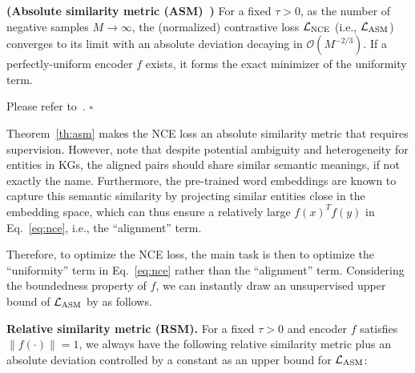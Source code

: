 \begin{theorem}{\bf (Absolute similarity metric (ASM)~\cite{wang2020understanding})} \label{th:asm}
For a fixed $\tau > 0$, as the number of negative samples $M \rightarrow \infty$, the (normalized) contrastive loss $\mathcal{L}_{\rm NCE}$ (i.e., $\mathcal{L}_{\rm ASM}$) converges to its limit with an absolute deviation decaying in $\mathcal{O}(M^{-2/3})$. If a perfectly-uniform encoder $f$ exists, it forms the exact minimizer of the uniformity term.
\end{theorem}

\vspace{-0.2cm}

\begin{pf}
    Please refer to~\cite{wang2020understanding}. \hfill$\square$
\end{pf}

Theorem~\ref{th:asm} makes the NCE loss an absolute similarity metric that requires supervision. 
However, note that despite potential ambiguity and heterogeneity for entities in KGs, the aligned pairs should share similar semantic meanings, if not exactly the name. 
Furthermore, the pre-trained word embeddings are known to capture this semantic similarity by projecting similar entities close in the embedding space, which can thus ensure a relatively large $f(x)^Tf(y)$ in Eq.~\ref{eq:nce}, i.e., the ``alignment'' term.  

Therefore, to optimize the NCE loss, the main task is then to optimize the ``uniformity'' term in Eq.~\ref{eq:nce} rather than the ``alignment'' term. 
Considering the boundedness property of $f$, we can instantly draw an unsupervised upper bound of $\mathcal{L}_{\rm ASM}$ by as follows. 


\begin{proposition}{\bf Relative similarity metric (RSM).} \label{th:rsm}
For a fixed $\tau > 0$ and encoder $f$ satisfies $\|f(\cdot)\|=1$, we always have the following relative similarity metric plus an absolute deviation controlled by a constant as an upper bound for $\mathcal{L}_{\rm ASM}$:


\end{proposition}

